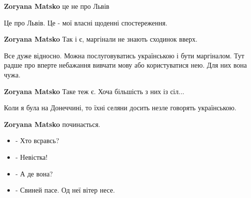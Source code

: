 \begin{itemize}
\begin{itemize}
\textbf{Zoryana Matsko} це не про Львів

 
Це про Львів. Це - мої власні щоденні спостереження.

 
\textbf{Zoryana Matsko} Так і є, маргінали не знають сходинок вверх.

 

Все дуже відносно. Можна послуговуватись українською і бути маргіналом. Тут
радше про вперте небажання вивчати мову або користуватися нею. Для них вона
чужа.


 
\textbf{Zoryana Matsko} Таке теж є. Хоча більшість з них із сіл...

 
Коли я була на Донеччині, то їхні селяни досить незле говорять українською.

 
\textbf{Zoryana Matsko} починається.
\begin{itemize}
  \item - Хто всравсь?
  \item - Невістка!
  \item - А де вона?
  \item - Свиней пасе. Од неї вітер несе.
\end{itemize}


\end{itemize}
\end{itemize}
